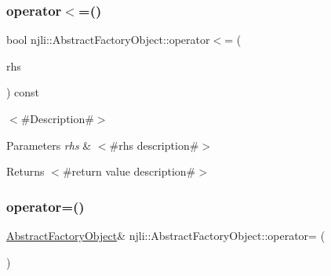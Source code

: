 \subsubsection{\texorpdfstring{operator$<$=()}{operator<=()}}
{\footnotesize\ttfamily bool njli\+::\+Abstract\+Factory\+Object\+::operator$<$= (\begin{DoxyParamCaption}\item[{const \mbox{\hyperlink{classnjli_1_1_abstract_factory_object}{Abstract\+Factory\+Object}} \&}]{rhs }\end{DoxyParamCaption}) const}

$<$\#\+Description\#$>$


\begin{DoxyParams}{Parameters}
{\em rhs} & $<$\#rhs description\#$>$\\
\hline
\end{DoxyParams}
\begin{DoxyReturn}{Returns}
$<$\#return value description\#$>$ 
\end{DoxyReturn}
\mbox{\label{classnjli_1_1_abstract_factory_object_ae2c1cfc2cf1b38931ac450e2598a6bb9}} 
\subsubsection{\texorpdfstring{operator=()}{operator=()}}
{\footnotesize\ttfamily \mbox{\hyperlink{classnjli_1_1_abstract_factory_object}{Abstract\+Factory\+Object}}\& njli\+::\+Abstract\+Factory\+Object\+::operator= (\begin{DoxyParamCaption}\item[{const \mbox{\hyperlink{classnjli_1_1_abstract_factory_object}{Abstract\+Factory\+Object}} \&}]{ }\end{DoxyParamCaption})\hspace{0.3cm}{\ttfamily [private]}}

\mbox{\label{classnjli_1_1_abstract_factory_object_ae620e2d5fd6bacf75d6dc63a1a499856}} 
